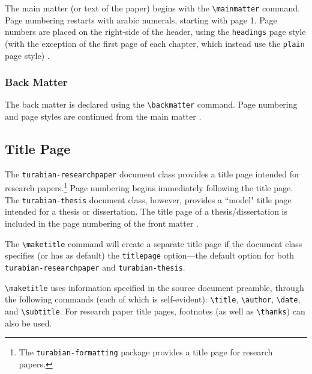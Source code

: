 \documentclass{article}
\begin{document}
The main matter (or text of the paper) begins with the \texttt{\textbackslash mainmatter} command. Page numbering restarts with arabic numerals, starting with page 1. Page numbers are placed on the right-side of the header, using the \texttt{headings} page style (with the exception of the first page of each chapter, which instead use the \texttt{plain} page style) \autocite[373--374]{turabian_manual_2013}.

\subsubsection*{Back Matter}

The back matter is declared using the \texttt{\textbackslash backmatter} command. Page numbering and page styles are continued from the main matter \autocite[373--374]{turabian_manual_2013}.


\subsection{Title Page}
\label{subsec:titlepage}

The \texttt{turabian-researchpaper} document class provides a title page intended for research papers.\footnote{%
	The \texttt{turabian-formatting} package provides a title page for research papers.}
Page numbering begins immediately following the title page. The \texttt{turabian-thesis} document class, however, provides a ``model" title page intended for a thesis or dissertation. The title page of a thesis/dissertation is included in the page numbering of the front matter \autocite[376, 378]{turabian_manual_2013}.

%
The \texttt{\textbackslash maketitle} command will create a separate title page if the document class specifies (or has as default) the \texttt{titlepage} option---the default option for both \texttt{turabian-researchpaper} and \texttt{turabian-thesis}.

\texttt{\textbackslash maketitle} uses information specified in the source document preamble, through the following commands (each of which is self-evident): \texttt{\textbackslash title}, \texttt{\textbackslash author}, \texttt{\textbackslash date}, and \texttt{\textbackslash subtitle}. For research paper title pages, footnotes (as well as \texttt{\textbackslash thanks}) can also be used.
\end{document}
